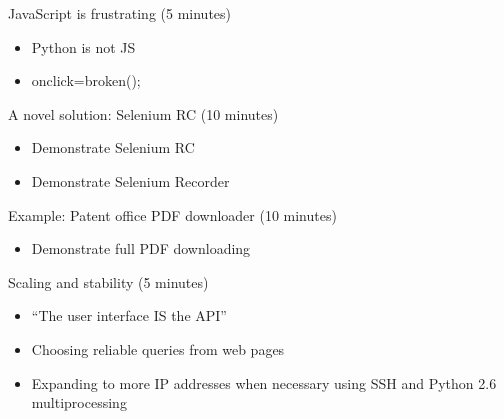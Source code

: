 \documentclass[10pt,a4paper,english]{article}
\begin{document}
\setcounter{listcnt0}{0}
\begin{list}{.}
{
\addtocounter{listcnt0}{19}
\setlength{\rightmargin}{\leftmargin}
}
\item {} 
JavaScript is frustrating (5 minutes)

\end{list}
\begin{itemize}
\item {} 
Python is not JS

\item {} 
onclick=broken();

\end{itemize}
\setcounter{listcnt0}{0}
\begin{list}{.}
{
\addtocounter{listcnt0}{20}
\setlength{\rightmargin}{\leftmargin}
}
\item {} 
A novel solution: Selenium RC (10 minutes)

\end{list}
\begin{itemize}
\item {} 
Demonstrate Selenium RC

\item {} 
Demonstrate Selenium Recorder

\end{itemize}
\setcounter{listcnt0}{0}
\begin{list}{.}
{
\addtocounter{listcnt0}{21}
\setlength{\rightmargin}{\leftmargin}
}
\item {} 
Example: Patent office PDF downloader (10 minutes)

\end{list}
\begin{itemize}
\item {} 
Demonstrate full PDF downloading

\end{itemize}
\setcounter{listcnt0}{0}
\begin{list}{.}
{
\addtocounter{listcnt0}{22}
\setlength{\rightmargin}{\leftmargin}
}
\item {} 
Scaling and stability (5 minutes)

\end{list}
\begin{itemize}
\item {} 
``The user interface IS the API''

\item {} 
Choosing reliable queries from web pages

\item {} 
Expanding to more IP addresses when necessary using SSH and Python 2.6 multiprocessing

\end{itemize}
\end{document}
